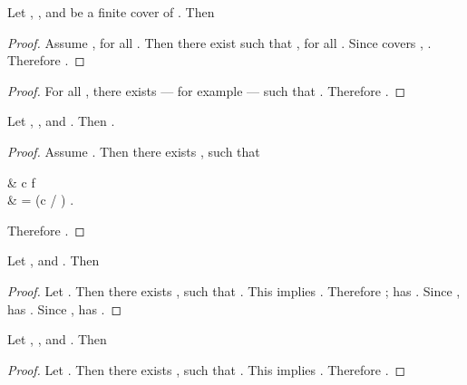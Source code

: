 \documentclass[b5paper, english, oneside]{memoir}
\begin{document}
\begin{lemma}
\label{LinearLocality}
Let , , and  be a finite cover of . Then 

\end{lemma}

\begin{proof}
Assume , for all . Then there exist  such that , for all . Since  covers , . Therefore .
\end{proof}

\begin{lemma}
\label{LinearOneSeparation}
\end{lemma}

\begin{proof}
For all , there exists  --- for example  --- such that . Therefore . 
\end{proof}

\begin{lemma}
\label{LinearScaleInvariance}
Let , , and . Then . 
\end{lemma}

\begin{proof}
Assume . Then there exists , such that
\begin{eqs}
 & \lt c f \\
{} & = (c / \alpha) .
\end{eqs}
Therefore . 
\end{proof}

\begin{lemma}
\label{LinearSubHomogenuity}
Let , and . Then  
 
\end{lemma}

\begin{proof}
Let . Then there exists , such that . This implies . Therefore ;  has . Since ,  has . Since ,  has .
\end{proof}

\begin{lemma}
\label{LinearSubComposability}
Let , , and . Then 

\end{lemma}

\begin{proof}
Let . Then there exists , such that . This implies . Therefore .
\end{proof}
\end{document}
